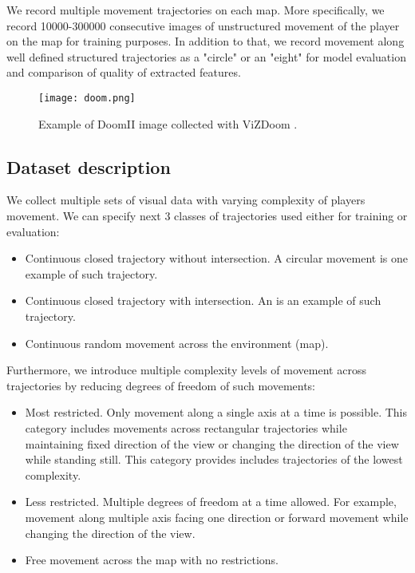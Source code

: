 We record multiple movement trajectories on each map.
More specifically, we record 10000-300000 consecutive images of unstructured movement of the player on the map for training purposes.
In addition to that, we record movement along well defined structured trajectories as a "circle" or an "eight" for model evaluation and comparison of quality of extracted features.


\begin{figure}
\centering
\texttt{[image: doom.png]} %
\caption{Example of DoomII image collected with ViZDoom \cite{Kempka2016}.}
\label{fig:doom}
\end{figure}

\subsection{Dataset description}

We collect multiple sets of visual data with varying complexity of players movement.
We can specify next 3 classes of trajectories used either for training or evaluation:
\begin{itemize}
  \item Continuous closed trajectory without intersection. A circular movement is one example of such trajectory.
  \item Continuous closed trajectory with intersection. An  is an example of such trajectory.
  \item Continuous random movement across the environment (map).
\end{itemize}

Furthermore, we introduce multiple complexity levels of movement across trajectories by reducing degrees of freedom of such movements:
\begin{itemize}
  \item Most restricted. Only movement along a single axis at a time is possible. This category includes movements across rectangular trajectories while maintaining fixed direction of the view or changing the direction of the view while standing still. This category provides includes trajectories of the lowest complexity.
  \item Less restricted. Multiple degrees of freedom at a time allowed. For example, movement along multiple axis facing one direction or forward movement while changing the direction of the view.
  \item Free movement across the map with no restrictions.
\end{itemize}


